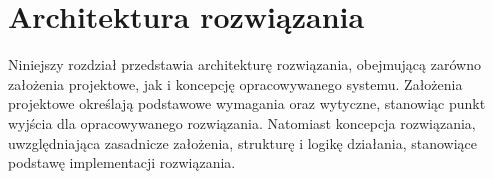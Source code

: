 \chapter{Architektura rozwiązania}

Niniejszy rozdział przedstawia architekturę rozwiązania, obejmującą zarówno założenia projektowe, jak i koncepcję opracowywanego systemu. Założenia projektowe określają podstawowe wymagania oraz wytyczne, stanowiąc punkt wyjścia dla opracowywanego rozwiązania. Natomiast koncepcja rozwiązania, uwzględniająca zasadnicze założenia, strukturę i logikę działania, stanowiące podstawę implementacji rozwiązania.












